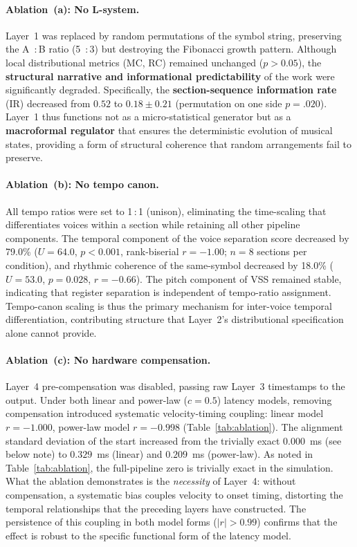 \documentclass[a4paper]{article}
\theoremstyle{definition}
\theoremstyle{remark}
\begin{document}
\paragraph{Ablation~(a): No L-system.}
Layer~1 was replaced by random permutations of the symbol string, preserving the A \,:\,B ratio (5 \,:\,3) but destroying the Fibonacci growth pattern. Although local distributional metrics (MC, RC) remained unchanged ($p > 0.05$), the \textbf{structural narrative and informational predictability} of the work were significantly degraded. Specifically, the \textbf{section-sequence information rate} (IR) decreased from $0.52$ to $0.18 \pm 0.21$ (permutation on one side $p = .020$). Layer~1 thus functions not as a micro-statistical generator but as a \textbf{macroformal regulator} that ensures the deterministic evolution of musical states, providing a form of structural coherence that random arrangements fail to preserve.

\paragraph{Ablation~(b): No tempo canon.}
All tempo ratios were set to 1\,:\,1 (unison), eliminating the time-scaling that differentiates voices within a section while retaining all other pipeline components. The temporal component of the voice separation score decreased by 79.0\% ($U = 64.0$, $p < 0.001$, rank-biserial $r = -1.00$; $n = 8$ sections per condition), and rhythmic coherence of the same-symbol decreased by 18.0\% ($U = 53.0$, $p = 0.028$, $r = -0.66$). The pitch component of VSS remained stable, indicating that register separation is independent of tempo-ratio assignment. Tempo-canon scaling is thus the primary mechanism for inter-voice temporal differentiation, contributing structure that Layer~2's distributional specification alone cannot provide.

\paragraph{Ablation~(c): No hardware compensation.}
Layer~4 pre-compensation was disabled, passing raw Layer~3 timestamps to the output. Under both linear and power-law ($c = 0.5$) latency models, removing compensation introduced systematic velocity-timing coupling: linear model $r = -1.000$, power-law model $r = -0.998$ (Table~\ref{tab:ablation}). The alignment standard deviation of the start increased from the trivially exact $0.000$~ms (see below note) to $0.329$~ms (linear) and $0.209$~ms (power-law). As noted in Table~\ref{tab:ablation}, the full-pipeline zero is trivially exact in the simulation. What the ablation demonstrates is the \emph{necessity} of Layer~4: without compensation, a systematic bias couples velocity to onset timing, distorting the temporal relationships that the preceding layers have constructed. The persistence of this coupling in both model forms ($|r| > 0.99$) confirms that the effect is robust to the specific functional form of the latency model.
\end{document}

